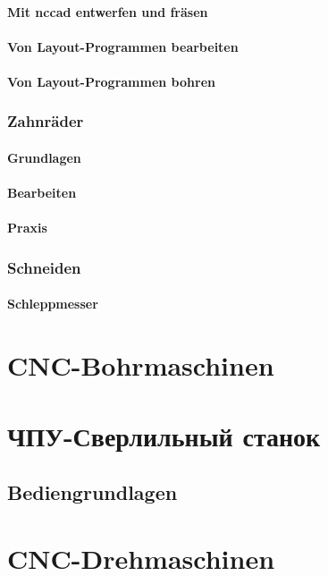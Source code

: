 \documentclass[14pt,a4paper]{book}
\begin{document}
			\subsubsection{Mit nccad entwerfen und fräsen} 
			\subsubsection{Von Layout-Programmen bearbeiten} 
			\subsubsection{Von Layout-Programmen bohren} 
		\subsection{Zahnräder} 
			\subsubsection{Grundlagen} 
			\subsubsection{Bearbeiten} 
			\subsubsection{Praxis} 			
		\subsection{Schneiden} 
			\subsubsection{Schleppmesser} 
		 
\chapter{CNC-Bohrmaschinen} 
\chapter{ЧПУ-Сверлильный станок} 
	\section{Bediengrundlagen}

\chapter{CNC-Drehmaschinen}
\end{document}
